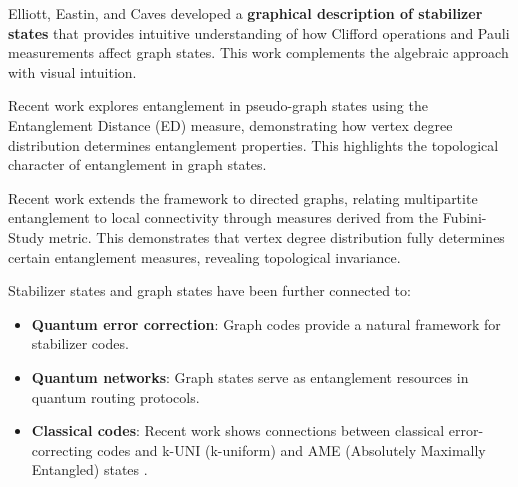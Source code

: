 \documentclass[12pt,a4paper]{article}
\begin{document}
Elliott, Eastin, and Caves developed a \textbf{graphical description of stabilizer states} that provides intuitive understanding of how Clifford operations and Pauli measurements affect graph states. This work complements the algebraic approach with visual intuition.

Recent work explores entanglement in pseudo-graph states using the Entanglement Distance (ED) measure, demonstrating how vertex degree distribution determines entanglement properties. This highlights the topological character of entanglement in graph states.

Recent work extends the framework to directed graphs, relating multipartite entanglement to local connectivity through measures derived from the Fubini-Study metric. This demonstrates that vertex degree distribution fully determines certain entanglement measures, revealing topological invariance.

Stabilizer states and graph states have been further connected to:
\begin{itemize}
	\item \textbf{Quantum error correction}: Graph codes provide a natural framework for stabilizer codes.
	\item \textbf{Quantum networks}: Graph states serve as entanglement resources in quantum routing protocols.
	\item \textbf{Classical codes}: Recent work shows connections between classical error-correcting codes and k-UNI (k-uniform) and AME (Absolutely Maximally Entangled) states \cite{Raissi2021}.
\end{itemize}
\end{document}
